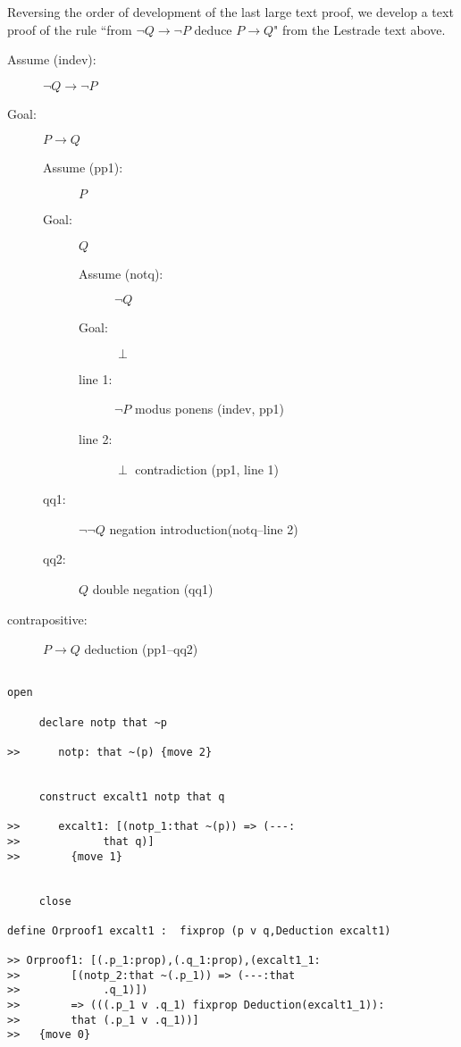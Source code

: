 \documentclass[12pt]{article}
\begin{document}
Reversing the order of development of the last large text proof, we develop a text proof of the rule ``from $\neg Q \rightarrow \neg P$ deduce $P \rightarrow Q$" from the Lestrade text above.

\begin{description}

\item [Assume (indev):]  $\neg Q \rightarrow \neg P$

\item[Goal:]  $P \rightarrow Q$

\begin{description}

\item[Assume (pp1):]  $P$

\item[Goal:] $Q$

\begin{description}

\item[Assume (notq):]  $\neg Q$

\item[Goal:]  $\perp$

\item[line 1:]  $\neg P$ modus ponens (indev, pp1)

\item[line 2:]  $\perp$ contradiction (pp1, line 1)

\end{description}

\item[qq1:]  $\neg\neg Q$ negation introduction(notq--line 2)

\item[qq2:]  $Q$ double negation (qq1)

\end{description}

\item[contrapositive:]  $P \rightarrow Q$ deduction (pp1--qq2)

\end{description}

\begin{verbatim}

open

     declare notp that ~p

>>      notp: that ~(p) {move 2}


     construct excalt1 notp that q

>>      excalt1: [(notp_1:that ~(p)) => (---:
>>             that q)]
>>        {move 1}


     close

define Orproof1 excalt1 :  fixprop (p v q,Deduction excalt1)

>> Orproof1: [(.p_1:prop),(.q_1:prop),(excalt1_1:
>>        [(notp_2:that ~(.p_1)) => (---:that 
>>             .q_1)])
>>        => (((.p_1 v .q_1) fixprop Deduction(excalt1_1)):
>>        that (.p_1 v .q_1))]
>>   {move 0}

\end{verbatim}
\end{document}
